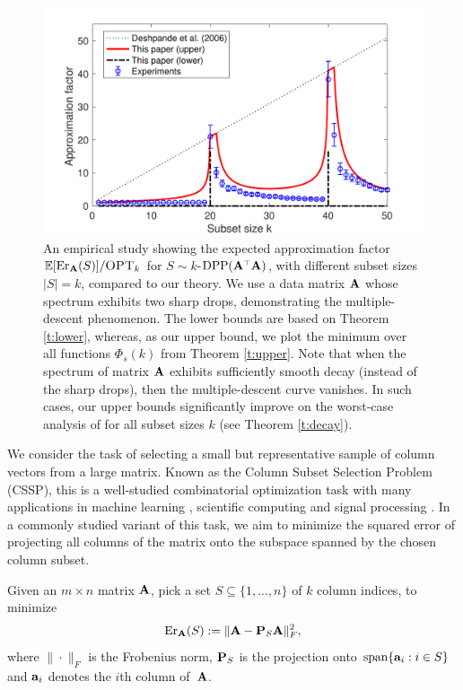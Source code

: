 \documentclass{article}
\begin{document}
\begin{figure}
  \centering  
  \includegraphics[width=\ifisarxiv 0.6\else 0.5\fi\textwidth]{figs/nystrom/nystrom-bounds}
  \caption{An empirical study showing the
    expected approximation factor $\E[\Er_\A(S)]/\opt$ for
$S\sim k$-$\DPP(\A^\top\A)$, with
    different subset sizes $|S|=k$, compared to our theory. We use a
    data matrix $\A$ 
    whose
    spectrum exhibits two sharp drops, demonstrating
    the multiple-descent phenomenon. The lower bounds are based on Theorem
    \ref{t:lower}, whereas, as our upper bound, we plot the
    minimum over all functions $\Phi_s(k)$ from Theorem
    \ref{t:upper}. Note that when the spectrum of
    matrix $\A$ exhibits sufficiently smooth decay (instead of the sharp drops), then the
    multiple-descent curve vanishes. In such cases, our upper bounds
    significantly improve on the worst-case analysis of \citet{pca-volume-sampling}
    for all subset sizes $k$ (see Theorem \ref{t:decay}).
  }
  \label{f:intro}
\end{figure}
We consider the task of selecting a small but representative sample of
column vectors from a large matrix. Known as the Column Subset Selection
Problem (CSSP), this is a well-studied combinatorial optimization task with
many applications in machine learning  
\citep[e.g., feature selection, see][]{Guyon03FeatureSelection,BoutsidisMD08},
scientific computing \citep[e.g.,][]{Chan92RankRevealingQR,Drineas08CUR} and signal processing
\citep[e.g.,][]{Balzano10MatchedSubspace}. In a 
commonly studied variant of this task, we aim to minimize the
squared error of projecting all columns of the matrix onto the
subspace spanned by the chosen column subset.
\begin{definition}[CSSP]
  Given an $m\times n$ matrix $\A$, pick a set $S\subseteq\{1,...,n\}$ of 
  $k$ column indices, to minimize
  \begin{align*}
   \Er_\A(S) := \|\A - \P_S\A\|_F^2,
  \end{align*}
  where $\|\cdot\|_F$ is the Frobenius norm, $\P_S$ is the
  projection onto $\mathrm{span}\{\a_i:i\in S\}$ and $\a_i$ denotes the $i$th
  column of~$\A$.
\end{definition}
\end{document}
